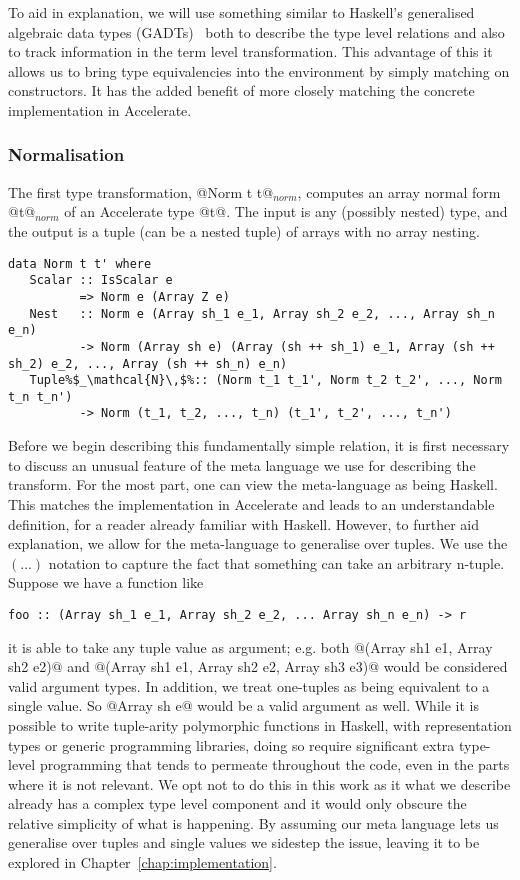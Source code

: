 To aid in explanation, we will use something similar to Haskell's generalised algebraic data types (GADTs)~\citep{Jones:2006eh} both to describe the type level relations and also to track information in the term level transformation. This advantage of this it allows us to bring type equivalencies into the environment by simply matching on constructors. It has the added benefit of more closely matching the concrete implementation in Accelerate.

\subsubsection{Normalisation}
The first type transformation, @Norm t t@$_{\textit{norm}}$, computes an array normal form @t@$_{\textit{norm}}$ of an Accelerate type @t@. The input is any (possibly nested) type, and the output is a tuple (can be a nested tuple) of arrays with no array nesting.

\begin{lstlisting}[style=ndp]
data Norm t t' where
   Scalar :: IsScalar e
          => Norm e (Array Z e)
   Nest   :: Norm e (Array sh_1 e_1, Array sh_2 e_2, ..., Array sh_n e_n)
          -> Norm (Array sh e) (Array (sh ++ sh_1) e_1, Array (sh ++ sh_2) e_2, ..., Array (sh ++ sh_n) e_n)
   Tuple%$_\mathcal{N}\,$%:: (Norm t_1 t_1', Norm t_2 t_2', ..., Norm t_n t_n')
          -> Norm (t_1, t_2, ..., t_n) (t_1', t_2', ..., t_n')
\end{lstlisting}

Before we begin describing this fundamentally simple relation, it is first necessary to discuss an unusual feature of the meta language we use for describing the transform. For the most part, one can view the meta-language as being Haskell. This matches the implementation in Accelerate and leads to an understandable definition, for a reader already familiar with Haskell. However, to further aid explanation, we allow for the meta-language to generalise over tuples. We use the $(...)$ notation to capture the fact that something can take an arbitrary n-tuple. Suppose we have a function like
%
\begin{lstlisting}
foo :: (Array sh_1 e_1, Array sh_2 e_2, ... Array sh_n e_n) -> r
\end{lstlisting}
%
it is able to take any tuple value as argument; e.g. both @(Array sh1 e1, Array sh2 e2)@ and @(Array sh1 e1, Array sh2 e2, Array sh3 e3)@ would be considered valid argument types. In addition, we treat one-tuples as being equivalent to a single value. So @Array sh e@ would be a valid argument as well. While it is possible to write tuple-arity polymorphic functions in Haskell, with representation types or generic programming libraries, doing so require significant extra type-level programming that tends to permeate throughout the code, even in the parts where it is not relevant. We opt not to do this in this work as it what we describe already has a complex type level component and it would only obscure the relative simplicity of what is happening. By assuming our meta language lets us generalise over tuples and single values we sidestep the issue, leaving it to be explored in Chapter~\ref{chap:implementation}.

